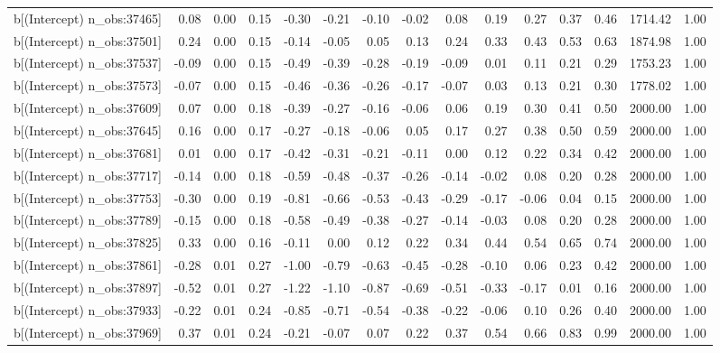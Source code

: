 \begin{table}[ht]
\begin{tabular}{rrrrrrrrrrrrrrr}
  b[(Intercept) n\_obs:37465] & 0.08 & 0.00 & 0.15 & -0.30 & -0.21 & -0.10 & -0.02 & 0.08 & 0.19 & 0.27 & 0.37 & 0.46 & 1714.42 & 1.00 \\ 
  b[(Intercept) n\_obs:37501] & 0.24 & 0.00 & 0.15 & -0.14 & -0.05 & 0.05 & 0.13 & 0.24 & 0.33 & 0.43 & 0.53 & 0.63 & 1874.98 & 1.00 \\ 
  b[(Intercept) n\_obs:37537] & -0.09 & 0.00 & 0.15 & -0.49 & -0.39 & -0.28 & -0.19 & -0.09 & 0.01 & 0.11 & 0.21 & 0.29 & 1753.23 & 1.00 \\ 
  b[(Intercept) n\_obs:37573] & -0.07 & 0.00 & 0.15 & -0.46 & -0.36 & -0.26 & -0.17 & -0.07 & 0.03 & 0.13 & 0.21 & 0.30 & 1778.02 & 1.00 \\ 
  b[(Intercept) n\_obs:37609] & 0.07 & 0.00 & 0.18 & -0.39 & -0.27 & -0.16 & -0.06 & 0.06 & 0.19 & 0.30 & 0.41 & 0.50 & 2000.00 & 1.00 \\ 
  b[(Intercept) n\_obs:37645] & 0.16 & 0.00 & 0.17 & -0.27 & -0.18 & -0.06 & 0.05 & 0.17 & 0.27 & 0.38 & 0.50 & 0.59 & 2000.00 & 1.00 \\ 
  b[(Intercept) n\_obs:37681] & 0.01 & 0.00 & 0.17 & -0.42 & -0.31 & -0.21 & -0.11 & 0.00 & 0.12 & 0.22 & 0.34 & 0.42 & 2000.00 & 1.00 \\ 
  b[(Intercept) n\_obs:37717] & -0.14 & 0.00 & 0.18 & -0.59 & -0.48 & -0.37 & -0.26 & -0.14 & -0.02 & 0.08 & 0.20 & 0.28 & 2000.00 & 1.00 \\ 
  b[(Intercept) n\_obs:37753] & -0.30 & 0.00 & 0.19 & -0.81 & -0.66 & -0.53 & -0.43 & -0.29 & -0.17 & -0.06 & 0.04 & 0.15 & 2000.00 & 1.00 \\ 
  b[(Intercept) n\_obs:37789] & -0.15 & 0.00 & 0.18 & -0.58 & -0.49 & -0.38 & -0.27 & -0.14 & -0.03 & 0.08 & 0.20 & 0.28 & 2000.00 & 1.00 \\ 
  b[(Intercept) n\_obs:37825] & 0.33 & 0.00 & 0.16 & -0.11 & 0.00 & 0.12 & 0.22 & 0.34 & 0.44 & 0.54 & 0.65 & 0.74 & 2000.00 & 1.00 \\ 
  b[(Intercept) n\_obs:37861] & -0.28 & 0.01 & 0.27 & -1.00 & -0.79 & -0.63 & -0.45 & -0.28 & -0.10 & 0.06 & 0.23 & 0.42 & 2000.00 & 1.00 \\ 
  b[(Intercept) n\_obs:37897] & -0.52 & 0.01 & 0.27 & -1.22 & -1.10 & -0.87 & -0.69 & -0.51 & -0.33 & -0.17 & 0.01 & 0.16 & 2000.00 & 1.00 \\ 
  b[(Intercept) n\_obs:37933] & -0.22 & 0.01 & 0.24 & -0.85 & -0.71 & -0.54 & -0.38 & -0.22 & -0.06 & 0.10 & 0.26 & 0.40 & 2000.00 & 1.00 \\ 
  b[(Intercept) n\_obs:37969] & 0.37 & 0.01 & 0.24 & -0.21 & -0.07 & 0.07 & 0.22 & 0.37 & 0.54 & 0.66 & 0.83 & 0.99 & 2000.00 & 1.00 \\ 

\end{tabular}
\end{table}
